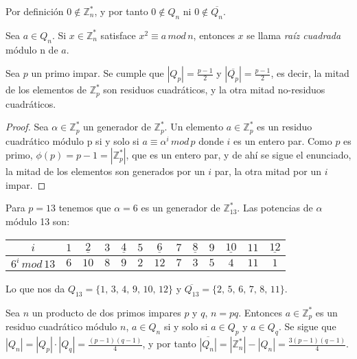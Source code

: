 \begin{remark}
	Por definición $0 \notin \mathbb{Z}^*_n$, y por tanto $0 \notin Q_n$ ni $0 \notin \overline{Q_n}$.
\end{remark}



\begin{definition}
	Sea $a \in Q_n$. Si $x \in \mathbb{Z}^*_n$ satisface $ x^2 \equiv a \, mod \, n$, entonces $x$ se llama \textit{raíz cuadrada} módulo n de $a$.
\end{definition}



\begin{proposition}
	Sea $p$ un primo impar. Se cumple que $|Q_p| = \frac{p-1}{2}$ y $|\overline{Q_p}| = \frac{p-1}{2}$, es decir, la mitad de los elementos de $\mathbb{Z}^*_p$ son residuos cuadráticos, y la otra mitad no-residuos cuadráticos.
\end{proposition}

\begin{proof}
	Sea $\alpha \in \mathbb{Z}^*_p$ un generador de $\mathbb{Z}^*_p$.
	Un elemento $a \in \mathbb{Z}^*_p$ es un residuo cuadrático módulo p si y solo si $a \equiv \alpha^i \, mod \, p$ donde $i$ es un entero par. Como $p$ es primo, $\phi(p) = p-1 = |\mathbb{Z}^*_p|$, que es un entero par, y de ahí se sigue el enunciado, la mitad de los elementos son generados por un $i$ par, la otra mitad por un $i$ impar.
\end{proof}

\begin{example}
	Para $p=13$ tenemos que $\alpha = 6$ es un generador de $\mathbb{Z}^*_{13}$. Las potencias de $\alpha$ módulo 13 son:
	
	\begin{tabular}{|c||c|c|c|c|c|c|c|c|c|c|c|c|}
		 \hline
			$i$ & $1$ & $\underline{2}$ & $3$ & $\underline{4}$ & $5$ & $\underline{6}$ & $7$ & $\underline{8}$ & $9$ & $\underline{10}$ & $11$ & $\underline{12}$ \\
			\hline
			$6^i \, mod \, 13$ & $6$ & $10$ & $8$ & $9$ & $2$ & $12$ & $7$ & $3$ & $5$ & $4$ & $11$ & $1$ \\
		 \hline
	\end{tabular}

	\hfil

	Lo que nos da $Q_{13} = \{1,\,3,\,4,\,9,\,10,\,12\}$ y $\overline{Q_{13}} = \{2,\,5,\,6,\,7,\,8,\,11\}$.
\end{example}

\begin{proposition}
	\label{numResCuadpq:prop}
	Sea $n$ un producto de dos primos impares $p$ y $q$, $n = pq$. Entonces  $a \in \mathbb{Z}^*_p$ es un residuo cuadrático módulo $n$, $a \in Q_n$ si y solo si $a \in Q_p$ y $a \in Q_q$. Se sigue que $|Q_n| = |Q_p|\cdot |Q_q| = \frac{(p-1)(q-1)}{4}$, y por tanto  $\overline{|Q_n|} = |\mathbb{Z}^*_n| - |Q_n| = \frac{3(p-1)(q-1)}{4}$.
\end{proposition}

